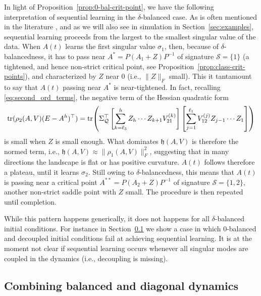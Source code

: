 \documentclass{article}
\def\tr{{\rm tr}}
\newcommand{\1}{\mathds{1}}
\begin{document}
In light of Proposition~\ref{prop:0-bal-crit-point}, we have the following interpretation of sequential learning in the $ \delta$-balanced case. 
As is often mentioned in the literature \cite{saxe2013exact,arora2019implicit,cohen2024lecture}, and as we will also see in simulation in Section~\ref{sec:examples}, sequential learning proceeds from the largest to the smallest singular value of the data. 
When $ A(t)$ learns the first singular value $ \sigma_1 $, then, because of $ \delta$-balancedness, it has to pass near $ A^\ast = P (A_1 + Z) P^{-1}$ of signature $ \mathcal{S}=\{ 1\}$ (a tightened, and hence non-strict critical point, see Proposition~\ref{prop:class-crit-points}), and characterized by $ Z $ near 0 (i.e., $ \| Z \|_F $ small). This it tantamount to say that $ A(t)$ passing near $ A^\ast $ is near-tightened. In fact, recalling \eqref{eq:second_ord_terms}, the negative term of the Hessian quadratic form 
\[
\tr{(\rho_2(A,V)(E - A^h)^\top)} = \tr{ \left( \Sigma_\mathcal{Q}^\top \left[ \sum_{k=\ell_3}^{h} Z_h \cdots Z_{k+1} V^{(k)}_{21} \right]\left[ \sum_{j=1}^{\ell_1} V^{(j)}_{12} Z_{j-1}\cdots Z_{1} \right]  \right)}
\]
is small when $ Z $ is small enough. What dominates $ \mathfrak{h}(A,V) $ is therefore the normed term, i.e., $ \mathfrak{h}(A,V) \approx \lVert \rho_1(A,V)  \rVert_F^2 $, suggesting that in many directions the landscape is flat or has positive curvature. $A(t)$ follows therefore a plateau, until it learns $ \sigma_2 $. Still owing to $ \delta$-balancedness, this means that $A(t)$ is passing near a critical point $ A^{\ast \ast} = P (A_2 + Z) P^{-1}$ of signature $ \mathcal{S}=\{ 1, 2\}$, another non-strict saddle point with $ Z$ small. The procedure is then repeated until completion.


While this pattern happens generically, it does not happens for all $ \delta$-balanced initial conditions. For instance in Section~\ref{sec:diag-bal} we show a case in which 0-balanced and decoupled initial conditions fail at achieving sequential learning. 
It is at the moment not clear if sequential learning occurs whenever all singular modes are coupled in the dynamics (i.e., decoupling is missing). 


\subsection{Combining balanced and diagonal dynamics}
\label{sec:diag-bal}
\end{document}
